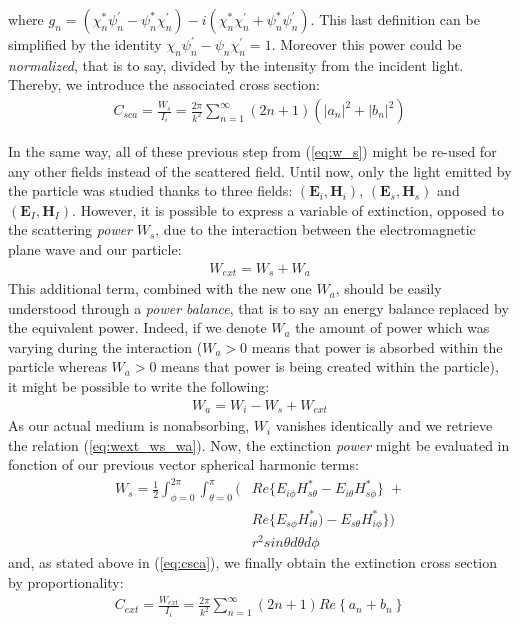 \documentclass{article}
\numberwithin{equation}{section}
\begin{document}
where $g_{n}=(\chi^{*}_{n}\psi^{'}_{n}-\psi^{*}_{n}\chi^{'}_{n})-i(\chi^{*}_{n}\chi^{'}_{n}+\psi^{*}_{n}\psi^{'}_{n})$. This last definition can be simplified by the identity $\chi_{n}\psi^{'}_{n}-\psi_{n}\chi^{'}_{n}=1$. Moreover this power could be \textit{normalized}, that is to say, divided by the intensity from the incident light. Thereby, we introduce the associated cross section:
\begin{align}\label{eq:csca}
C_{sca}=\frac{W_{s}}{I_{i}}=\frac{2\pi}{k^{2}}\sum_{n=1}^{\infty }(2n+1)(\left| a_{n} \right|^{2}+\left| b_{n} \right|^{2})
\end{align}

In the same way, all of these previous step from (\ref{eq:w_s}) might be re-used for any other fields instead of the scattered field. Until now, only the light emitted by the particle was studied thanks to three fields: $(\textbf{E}_{i}, \textbf{H}_{i})$, $(\textbf{E}_{s}, \textbf{H}_{s})$ and $(\textbf{E}_{I}, \textbf{H}_{I})$. However, it is possible to express a variable of extinction, opposed to the scattering \textit{power} $W_{s}$, due to the interaction between the electromagnetic plane wave and our particle:
\begin{align}\label{eq:wext_ws_wa}
W_{ext} = W_{s} + W_{a}
\end{align}
This additional term, combined with the new one $W_{a}$, should be easily understood through a \textit{power balance}, that is to say an energy balance replaced by the equivalent power. Indeed, if we denote $W_{a}$ the amount of power which was varying during the interaction ($W_{a} > 0$ means that power is absorbed within the particle whereas $W_{a} > 0$ means that power is being created within the particle), it might be possible to write the following:
\begin{align}
W_{a} = W_{i} - W_{s} + W_{ext}
\end{align}
As our actual medium is nonabsorbing, $W_{i}$ vanishes identically and we retrieve the relation (\ref{eq:wext_ws_wa}). Now, the extinction \textit{power} might be evaluated in fonction of our previous vector spherical harmonic terms:
\begin{equation}
\begin{aligned}
W_{s}=\frac{1}{2}\int_{\phi=0}^{2\pi}\int_{\theta=0}^{\pi} (&Re\{E_{i\phi}H^{*}_{s\theta} - E_{i\theta}H^{*}_{s\phi}\}\; +\\
&Re\{E_{s\phi}H^{*}_{i\theta}) - E_{s\theta}H^{*}_{i\phi}\}) \\
&r^{2}sin\theta d\theta d\phi
\end{aligned}
\end{equation}
and, as stated above in (\ref{eq:csca}), we finally obtain the extinction cross section by proportionality:
\begin{align}
C_{ext}=\frac{W_{ext}}{I_{i}}=\frac{2\pi}{k^{2}}\sum_{n=1}^{\infty }(2n+1)Re\left\{a_{n} + b_{n} \right\}
\end{align}
\end{document}
